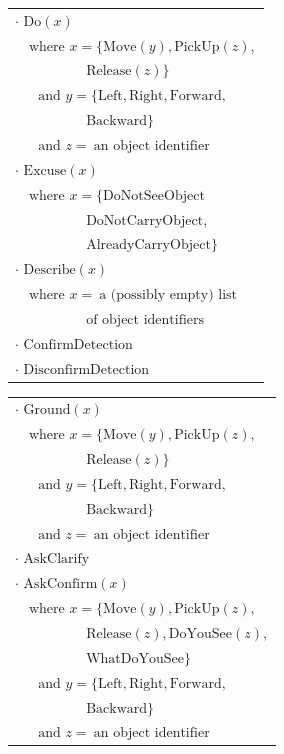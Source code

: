 \begin{table}[p]
\begin{footnotesize}
\begin{tabular}{p{60mm}} 
$\cdot$ $\mathrm{Do}(x) $ \\ $ \ \ \ \text{ where } x=\{\mathrm{Move}(y),\mathrm{PickUp}(z),$  \\ $\ \ \ \ \ \ \ \ \ \ \ \ \ \ \ \ \ \ \ \ \ \ \ \mathrm{Release}(z)\} $ \\ $ \ \ \ \ \ \ \text{ and } y = \{\mathrm{Left,Right,Forward,}$ \\ $ \ \ \ \ \ \ \ \ \ \ \ \ \ \ \ \ \ \ \ \ \ \ \ \mathrm{Backward}\} $ \\ $ \ \ \ \ \ \  \text{ and } z = \ \text{an object identifier}$ \\
$\cdot$ $\mathrm{Excuse}(x) $ \\ $ \ \ \  \text{ where } x = \{\mathrm{DoNotSeeObject}$ \\ $\ \ \ \ \ \ \ \ \ \ \ \ \ \ \ \ \ \ \ \ \ \ \ \mathrm{DoNotCarryObject,}$ \\ $\ \ \ \ \ \ \ \ \ \ \ \ \ \ \ \ \ \ \ \ \ \ \ \mathrm{AlreadyCarryObject}\}$ \\
$\cdot$ $\mathrm{Describe}(x) $ \\ $ \ \ \  \text{ where } x = \ \text{a (possibly empty) list}$ \\ $ \ \ \ \ \ \ \ \ \ \ \ \ \ \ \ \ \ \ \ \ \ \ \  \text{of object identifiers}$ \\
$\cdot$ $\mathrm{ConfirmDetection}$ \\
$\cdot$ $\mathrm{DisconfirmDetection}$ 
\end{tabular}
\hspace{2cm}
\begin{tabular}{p{60mm}} 
$\cdot$ $\mathrm{Ground}(x) $ \\ $ \ \ \ \text{ where } x=\{\mathrm{Move}(y),\mathrm{PickUp}(z),$  \\ $\ \ \ \ \ \ \ \ \ \ \ \ \ \ \ \ \ \ \ \ \ \ \ \mathrm{Release}(z)\} $ \\ $\ \ \ \ \ \  \text{ and } y = \{\mathrm{Left,Right,Forward,}$ \\ $\ \ \ \ \ \ \ \ \ \ \ \ \ \ \ \ \ \ \ \ \ \ \  \mathrm{Backward}\} $ \\ $\ \  \ \ \ \ \text{ and } z = \ \text{an object identifier}$ \\
$\cdot$ $\mathrm{AskClarify}$ \\
$\cdot$ $\mathrm{AskConfirm}(x) $ \\ $\ \ \ \text{ where } x=\{\mathrm{Move}(y),\mathrm{PickUp}(z),$  \\ $\ \ \ \ \ \ \ \ \ \ \ \ \ \ \ \ \ \ \ \ \ \ \ \mathrm{Release}(z), \mathrm{DoYouSee}(z),$ \\ $ \ \ \ \ \ \ \ \ \ \ \ \ \ \ \ \ \ \ \ \ \ \ \ \mathrm{WhatDoYouSee} \} $ \\ $\ \ \ \ \ \  \text{ and } y = \{\mathrm{Left,Right,Forward,}$ \\ $\ \ \ \ \ \ \ \ \ \ \ \ \ \ \ \ \ \ \ \ \ \ \  \mathrm{Backward}\} $ \\ $\ \ \ \ \ \  \text{ and } z = \ \text{an object identifier}$ \

\end{tabular}
\end{footnotesize}
\end{table}
